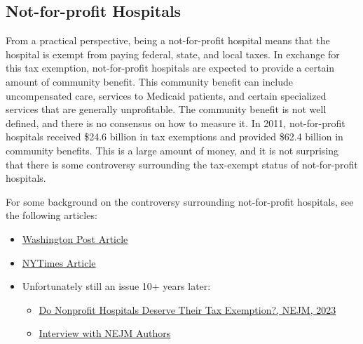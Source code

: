 \documentclass[
  letterpaper,
  DIV=11,
  numbers=noendperiod]{scrreport}
\providecommand{\tightlist}{%
  \setlength{\itemsep}{0pt}\setlength{\parskip}{0pt}}\usepackage{longtable,booktabs,array}
\theoremstyle{definition}
\theoremstyle{remark}
\begin{document}
\hypertarget{not-for-profit-hospitals}{%
\subsection*{Not-for-profit Hospitals}\label{not-for-profit-hospitals}}

From a practical perspective, being a not-for-profit hospital means that
the hospital is exempt from paying federal, state, and local taxes. In
exchange for this tax exemption, not-for-profit hospitals are expected
to provide a certain amount of community benefit. This community benefit
can include uncompensated care, services to Medicaid patients, and
certain specialized services that are generally unprofitable. The
community benefit is not well defined, and there is no consensus on how
to measure it. In 2011, not-for-profit hospitals received \$24.6 billion
in tax exemptions and provided \$62.4 billion in community benefits.
This is a large amount of money, and it is not surprising that there is
some controversy surrounding the tax-exempt status of not-for-profit
hospitals.

For some background on the controversy surrounding not-for-profit
hospitals, see the following articles:

\begin{itemize}
\tightlist
\item
  \href{https://www.washingtonpost.com/national/health-science/value-of-tax-breaks-for-nonprofit-hospitals-doubled-in-a-decade/2015/06/17/4162c640-1450-11e5-9ddc-e3353542100c_story.html?utm_term=.4f877a72a09f}{Washington
  Post Article}
\item
  \href{https://www.nytimes.com/2013/12/17/us/benefits-questioned-in-tax-breaks-for-nonprofit-hospitals.html}{NYTimes
  Article}
\item
  Unfortunately still an issue 10+ years later:

  \begin{itemize}
  \tightlist
  \item
    \href{https://www.nejm.org/doi/full/10.1056/NEJMp2303245}{Do
    Nonprofit Hospitals Deserve Their Tax Exemption?, NEJM, 2023}
  \item
    \href{https://www.nejm.org/action/showMediaPlayer?doi=10.1056\%2FNEJMdo007183\&aid=10.1056\%2FNEJMp2303245\&area=}{Interview
    with NEJM Authors}
  \end{itemize}
\end{itemize}
\end{document}
